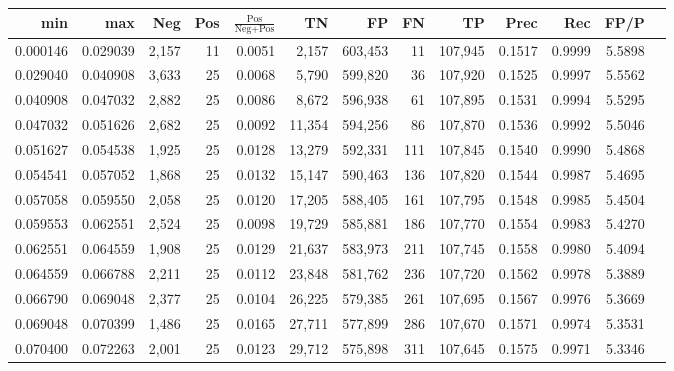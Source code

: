\begin{tabular}{rrrrrrrrrrrrr}
\toprule
     min &      max &   Neg & Pos & $\frac{\text{Pos}}{\text{Neg}+\text{Pos}}$ &      TN &      FP &      FN &      TP &   Prec &    Rec &   FP/P \\
\midrule
0.000146 & 0.029039 & 2,157 &  11 &                                     0.0051 &   2,157 & 603,453 &      11 & 107,945 & 0.1517 & 0.9999 & 5.5898 \\
0.029040 & 0.040908 & 3,633 &  25 &                                     0.0068 &   5,790 & 599,820 &      36 & 107,920 & 0.1525 & 0.9997 & 5.5562 \\
0.040908 & 0.047032 & 2,882 &  25 &                                     0.0086 &   8,672 & 596,938 &      61 & 107,895 & 0.1531 & 0.9994 & 5.5295 \\
0.047032 & 0.051626 & 2,682 &  25 &                                     0.0092 &  11,354 & 594,256 &      86 & 107,870 & 0.1536 & 0.9992 & 5.5046 \\
0.051627 & 0.054538 & 1,925 &  25 &                                     0.0128 &  13,279 & 592,331 &     111 & 107,845 & 0.1540 & 0.9990 & 5.4868 \\
0.054541 & 0.057052 & 1,868 &  25 &                                     0.0132 &  15,147 & 590,463 &     136 & 107,820 & 0.1544 & 0.9987 & 5.4695 \\
0.057058 & 0.059550 & 2,058 &  25 &                                     0.0120 &  17,205 & 588,405 &     161 & 107,795 & 0.1548 & 0.9985 & 5.4504 \\
0.059553 & 0.062551 & 2,524 &  25 &                                     0.0098 &  19,729 & 585,881 &     186 & 107,770 & 0.1554 & 0.9983 & 5.4270 \\
0.062551 & 0.064559 & 1,908 &  25 &                                     0.0129 &  21,637 & 583,973 &     211 & 107,745 & 0.1558 & 0.9980 & 5.4094 \\
0.064559 & 0.066788 & 2,211 &  25 &                                     0.0112 &  23,848 & 581,762 &     236 & 107,720 & 0.1562 & 0.9978 & 5.3889 \\
0.066790 & 0.069048 & 2,377 &  25 &                                     0.0104 &  26,225 & 579,385 &     261 & 107,695 & 0.1567 & 0.9976 & 5.3669 \\
0.069048 & 0.070399 & 1,486 &  25 &                                     0.0165 &  27,711 & 577,899 &     286 & 107,670 & 0.1571 & 0.9974 & 5.3531 \\
0.070400 & 0.072263 & 2,001 &  25 &                                     0.0123 &  29,712 & 575,898 &     311 & 107,645 & 0.1575 & 0.9971 & 5.3346 \\

\end{tabular}
